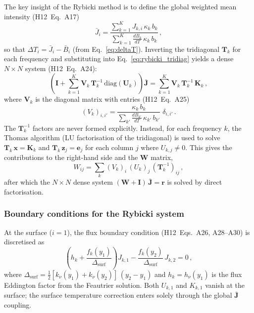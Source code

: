 The key insight of the Rybicki method is to define the global weighted mean intensity (H12~Eq.~A17)
\begin{equation}
  \bar{J}_i = \frac{\sum_{k=1}^{K} J_{k,i}\,\kappa_{k}\,b_k}
                    {\sum_{k=1}^{K} \frac{dB_k}{dT}\,\kappa_k\,b_k}\,,
  \label{eq:Jbar}
\end{equation}
so that $\Delta T_i = \bar{J}_i - \bar{B}_i$ (from Eq.~\ref{eq:deltaT}). Inverting the tridiagonal $\mathbf{T}_k$ for each frequency and substituting into Eq.~\eqref{eq:rybicki_tridiag} yields a dense $N\!\times\!N$ system (H12~Eq.~A24):
\begin{equation}
  \left(\mathbf{I} + \sum_{k=1}^{K}
    \mathbf{V}_k\,\mathbf{T}_k^{-1}\,\mathrm{diag}(\mathbf{U}_k)
  \right)\bar{\mathbf{J}}
  = \sum_{k=1}^{K} \mathbf{V}_k\,\mathbf{T}_k^{-1}\,\mathbf{K}_k\,,
  \label{eq:global_system}
\end{equation}
where $\mathbf{V}_k$ is the diagonal matrix with entries (H12~Eq.~A25)
\begin{equation}
  (V_k)_{i,i'} = \frac{\kappa_k\,b_k}
    {\sum_{k'}\frac{dB_{k'}}{dT}\,\kappa_{k'}\,b_{k'}}\;\delta_{i,i'}\,.
\end{equation}
The $\mathbf{T}_k^{-1}$ factors are never formed explicitly. Instead, for each frequency $k$, the Thomas algorithm (LU factorisation of the tridiagonal) is used to solve $\mathbf{T}_k\,\mathbf{x}=\mathbf{K}_k$ and $\mathbf{T}_k\,\mathbf{z}_j = \mathbf{e}_j$ for each column $j$ where $U_{k,j}\neq 0$. This gives the contributions to the right-hand side and the $\mathbf{W}$ matrix,
\begin{equation}
  W_{ij} = \sum_k (V_k)_i\,(U_k)_j\,(\mathbf{T}_k^{-1})_{ij}\,,
\end{equation}
after which the $N\!\times\!N$ dense system $(\mathbf{W}+\mathbf{I})\,\bar{\mathbf{J}} = \mathbf{r}$ is solved by direct factorisation.

\subsubsection{Boundary conditions for the Rybicki system}

At the surface ($i=1$), the flux boundary condition (H12~Eqs.~A26, A28--A30) is discretised as
\begin{equation}
  \left(h_k + \frac{f_k(y_1)}{\Delta_\mathrm{surf}}\right)J_{k,1}
  - \frac{f_k(y_2)}{\Delta_\mathrm{surf}}\,J_{k,2} = 0\,,
  \label{eq:rybicki_surface_bc}
\end{equation}
where $\Delta_\mathrm{surf} = \frac{1}{2}[k_\nu(y_1)+k_\nu(y_2)]\,(y_2-y_1)$ and $h_k = h_\nu(y_1)$ is the flux Eddington factor from the Feautrier solution. Both $U_{k,1}$ and $K_{k,1}$ vanish at the surface; the surface temperature correction enters solely through the global $\bar{\mathbf{J}}$ coupling.

